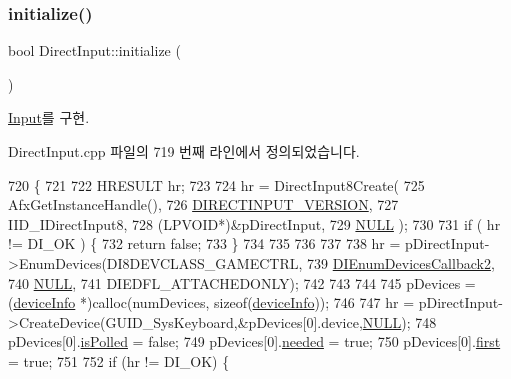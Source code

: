 \subsubsection{\texorpdfstring{initialize()}{initialize()}}
{\footnotesize\ttfamily bool Direct\+Input\+::initialize (\begin{DoxyParamCaption}{ }\end{DoxyParamCaption})\hspace{0.3cm}{\ttfamily [virtual]}}



\mbox{\hyperlink{class_input_affd45f0c278a6ff71b7ae1a567a3dc1c}{Input}}를 구현.



Direct\+Input.\+cpp 파일의 719 번째 라인에서 정의되었습니다.


\begin{DoxyCode}
720 \{
721 
722     HRESULT hr;
723 
724     hr = DirectInput8Create(
725              AfxGetInstanceHandle(),
726              \mbox{\hyperlink{_direct_input_8cpp_a1d7ab29fdefabdb4e7e7cd27ac4c9934}{DIRECTINPUT\_VERSION}},
727              IID\_IDirectInput8,
728              (LPVOID*)&pDirectInput,
729              \mbox{\hyperlink{getopt1_8c_a070d2ce7b6bb7e5c05602aa8c308d0c4}{NULL}} );
730 
731     \textcolor{keywordflow}{if} ( hr != DI\_OK ) \{
732         \textcolor{keywordflow}{return} \textcolor{keyword}{false};
733     \}
734 
735 
736 
737 
738     hr = pDirectInput->EnumDevices(DI8DEVCLASS\_GAMECTRL,
739                                    \mbox{\hyperlink{_direct_input_8cpp_afbc5dda36f4cf8d820d085fd629941a8}{DIEnumDevicesCallback2}},
740                                    \mbox{\hyperlink{getopt1_8c_a070d2ce7b6bb7e5c05602aa8c308d0c4}{NULL}},
741                                    DIEDFL\_ATTACHEDONLY);
742 
743 
744 
745     pDevices = (\mbox{\hyperlink{structdevice_info}{deviceInfo}} *)calloc(numDevices, \textcolor{keyword}{sizeof}(\mbox{\hyperlink{structdevice_info}{deviceInfo}}));
746 
747     hr = pDirectInput->CreateDevice(GUID\_SysKeyboard,&pDevices[0].device,\mbox{\hyperlink{getopt1_8c_a070d2ce7b6bb7e5c05602aa8c308d0c4}{NULL}});
748     pDevices[0].\mbox{\hyperlink{structdevice_info_a405fccb036e90884fb822c59433c2490}{isPolled}} = \textcolor{keyword}{false};
749     pDevices[0].\mbox{\hyperlink{structdevice_info_a3e85cef35fcad73f9f5fcd75a627ec80}{needed}}  = \textcolor{keyword}{true};
750     pDevices[0].\mbox{\hyperlink{structdevice_info_a0bc40134953f30c68ccf0d2d69e67f17}{first}}  = \textcolor{keyword}{true};
751 
752     \textcolor{keywordflow}{if} (hr != DI\_OK) \{

\end{DoxyCode}
